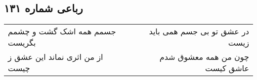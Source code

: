\begin{center}
\section*{رباعی شماره ۱۳۱}
\label{sec:sh131}
\begin{longtable}{l p{0.5cm} r}
جسمم همه اشک گشت و چشمم بگریست
&&
در عشق تو بی جسم همی باید زیست
\\
از من اثری نماند این عشق ز چیست
&&
چون من همه معشوق شدم عاشق کیست
\\
\end{longtable}
\end{center}
